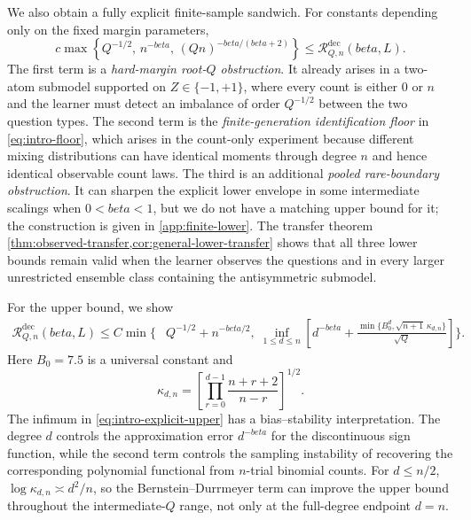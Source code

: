 \documentclass[11pt]{article}
\def\beta{beta}%
\newcommand{\calR}{\mathcal R}
\newcommand\ced[1]{{\color{teal!70!black} #1}}
\begin{document}
We also obtain a fully explicit finite-sample sandwich.  For constants depending only on the fixed margin parameters,
\begin{equation}
\label{eq:intro-explicit-lower}
c\max\left\{
Q^{-1/2},\,
n^{-\beta},\,
(Qn)^{-\beta/(\beta+2)}
\right\}
\le
\calR^{\mathrm{dec}}_{Q,n}(\beta,L).
\end{equation}
The first term is a \emph{hard-margin root-$Q$ obstruction}.  It already arises in a two-atom submodel supported on $Z\in\{-1,+1\}$, where every count is either $0$ or $n$ and the learner must detect an imbalance of order $Q^{-1/2}$ between the two question types.  The second term is the \emph{finite-generation identification floor} in \eqref{eq:intro-floor}, which arises in the count-only experiment because different mixing distributions can have identical moments through degree $n$ and hence identical observable count laws.  The third is an additional \emph{pooled rare-boundary obstruction}.  It can sharpen the explicit lower envelope in some intermediate scalings when $0<\beta<1$, but we do not have a matching upper bound for it; the construction is given in \cref{app:finite-lower}.  The transfer theorem \cref{thm:observed-transfer,cor:general-lower-transfer} shows that all three lower bounds remain valid when the learner observes the questions and in every larger unrestricted ensemble class containing the antisymmetric submodel.

For the upper bound, we show
\begin{equation}
\label{eq:intro-explicit-upper}
\begin{split}
\calR^{\mathrm{dec}}_{Q,n}(\beta,L)
\le C\min\Biggl\{&
Q^{-1/2}+n^{-\beta/2},\;
\inf_{1\le d\le n}
\left[
d^{-\beta}
+
\frac{\min\{B_0^d,\sqrt{n+1}\,\kappa_{d,n}\}}{\sqrt Q}
\right]
\Biggr\}.
\end{split}
\end{equation}
Here $B_0=7.5$ is a universal constant and
\[
\kappa_{d,n}
=
\left[
\prod_{r=0}^{d-1}\frac{n+r+2}{n-r}
\right]^{1/2}.
\]
The infimum in \eqref{eq:intro-explicit-upper} has a bias--stability interpretation.  The degree $d$ controls the approximation error $d^{-\beta}$ for the \ced{discontinuous sign function}, while the second term controls the sampling instability of recovering the corresponding polynomial functional from $n$-trial binomial counts.  For $d\le n/2$, $\log\kappa_{d,n}\asymp d^2/n$, so the Bernstein--Durrmeyer term can improve the upper bound throughout the intermediate-$Q$ range, not only at the full-degree endpoint $d=n$.
\end{document}
